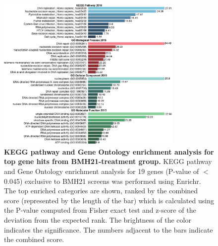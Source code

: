 \begin{figure}
    \centering
    \includegraphics[width=0.8\textwidth]{supplement/figures/BMH21_Enrichr}
    \caption[KEGG pathway and Gene Ontology enrichment analysis]
            {\small{\textbf{KEGG pathway and Gene Ontology enrichment analysis for top gene hits from BMH21-treatment group.}}
            \textbf{} KEGG pathway and Gene Ontology enrichment analysis for 19 genes (P-value of $<$0.045) exclusive to BMH21 screens was performed using Enrichr. The top enriched categories are shown, ranked by the combined score (represented by the length of the bar) which is calculated using the P-value computed from Fisher exact test and z-score of the deviation from the expected rank. The brightness of the color indicates the significance. The numbers adjacent to the bars indicate the combined score.
            }
        \label{sfig:bmh21_enrichr}
\end{figure}

